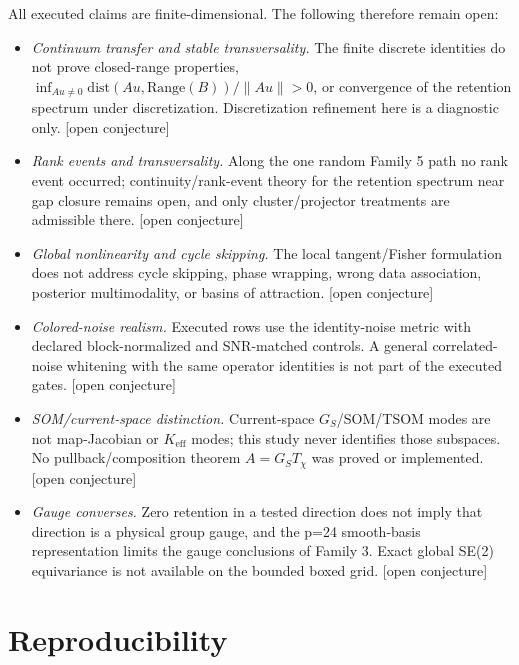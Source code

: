 \documentclass[12pt]{article}
\newcommand{\OPN}{\textnormal{[open conjecture]}}
\begin{document}
All executed claims are finite-dimensional. The following therefore remain
open:
\begin{itemize}
\item \emph{Continuum transfer and stable transversality.} The finite
discrete identities do not prove closed-range properties,
$\inf_{Au\ne0}\mathrm{dist}(Au,\mathrm{Range}(B))/\|Au\|>0$, or convergence of
the retention spectrum under discretization. Discretization refinement here is
a diagnostic only. \OPN{}
\item \emph{Rank events and transversality.} Along the one random Family 5 path
no rank event occurred; continuity/rank-event theory for the retention
spectrum near gap closure remains open, and only cluster/projector treatments
are admissible there. \OPN{}
\item \emph{Global nonlinearity and cycle skipping.} The local tangent/Fisher
formulation does not address cycle skipping, phase wrapping, wrong data
association, posterior multimodality, or basins of attraction. \OPN{}
\item \emph{Colored-noise realism.} Executed rows use the identity-noise metric
with declared block-normalized and SNR-matched controls. A general
correlated-noise whitening with the same operator identities is not part of
the executed gates. \OPN{}
\item \emph{SOM/current-space distinction.} Current-space
$G_S$/SOM/TSOM modes are not map-Jacobian or $K_{\mathrm{eff}}$ modes; this
study never identifies those subspaces. No pullback/composition theorem
$A=G_ST_\chi$ was proved or implemented. \OPN{}
\item \emph{Gauge converses.} Zero retention in a tested direction does not
imply that direction is a physical group gauge, and the p=24 smooth-basis
representation limits the gauge conclusions of Family 3. Exact global SE(2)
equivariance is not available on the bounded boxed grid. \OPN{}
\end{itemize}

\section{Reproducibility}\label{sec:repro}
\end{document}
